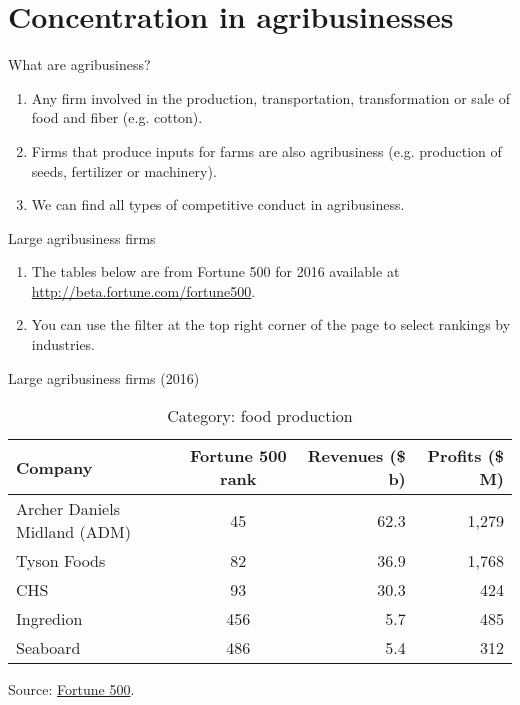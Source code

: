 \documentclass[table,xcolor=pdftex,dvipsnames]{beamer}\usepackage[]{graphicx}\usepackage[]{color}
\begin{document}
\section{Concentration in agribusinesses}

\begin{frame}{What are agribusiness?}
\begin{enumerate}[label=\textbullet]
  \item Any firm involved in the production, transportation, transformation or sale of food and fiber (e.g. cotton).
  \item Firms that produce inputs for farms are also agribusiness (e.g. production of seeds, fertilizer or machinery).
  \item We can find all types of competitive conduct in agribusiness.
\end{enumerate}
\end{frame}


\begin{frame}{Large agribusiness firms}
\begin{enumerate}[label=\textbullet]
  \item The tables below are from Fortune 500 for 2016 available at \url{http://beta.fortune.com/fortune500}.
  \item You can use the filter at the top right corner of the page to select rankings by industries.
\end{enumerate}
\end{frame}


\begin{frame}{Large agribusiness firms (2016)}
\begin{table}
\caption{Category: food production}
\begin{tabular}{l c r r}
  \toprule
  Company & \parbox[c]{0.75in}{Fortune 500 rank} & \parbox[c]{0.65in}{\centering Revenues (\$ b)} & \parbox[c]{0.60in}{\centering Profits (\$ M)}\\
  \midrule
  Archer Daniels Midland (ADM) & 45 & 62.3 & 1,279 \\
  Tyson Foods & 82 & 36.9 & 1,768 \\
  CHS & 93 & 30.3 & 424 \\
  Ingredion & 456 & 5.7 & 485 \\
  Seaboard & 486 & 5.4 & 312 \\
  \bottomrule
\end{tabular}
\end{table}
Source: \href{http://fortune.com/fortune500/}{Fortune 500}.
\end{frame}
\end{document}
